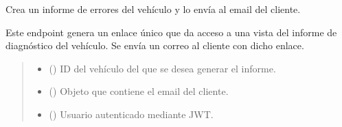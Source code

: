 \documentclass[letterpaper,10pt,spanish]{sphinxmanual}
\begin{document}

\begin{fulllineitems}
\label{\detokenize{modelos:main.crear_informe}}
\pysigstartsignatures
\pysiglinewithargsret
{}
{\sphinxparamcomma {}\sphinxparamcomma {}\sphinxparamcomma {}}
{}
\pysigstopsignatures
\sphinxAtStartPar
Crea un informe de errores del vehículo y lo envía al email del cliente.

\sphinxAtStartPar
Este endpoint genera un enlace único que da acceso a una vista del informe de diagnóstico del vehículo. Se envía un correo al cliente con dicho enlace.
\begin{quote}\begin{description}
\begin{itemize}
\item {} 
\sphinxAtStartPar
{} () \textendash{} ID del vehículo del que se desea generar el informe.

\item {} 
\sphinxAtStartPar
{} ({\hyperref[\detokenize{modelos:main.InformeRequest}]{}}) \textendash{} Objeto que contiene el email del cliente.

\item {} 
\sphinxAtStartPar
{} ({\hyperref[\detokenize{modelos:main.Usuario}]{}}) \textendash{} Usuario autenticado mediante JWT.


\end{itemize}
\end{description}
\end{quote}
\end{fulllineitems}
\end{document}
